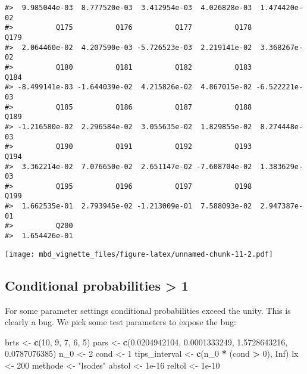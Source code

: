 \documentclass[]{article}
\newenvironment{Shaded}{\begin{snugshade}}{\end{snugshade}}
\newcommand{\DecValTok}[1]{\textcolor[rgb]{0.00,0.00,0.81}{#1}}
\newcommand{\FloatTok}[1]{\textcolor[rgb]{0.00,0.00,0.81}{#1}}
\newcommand{\KeywordTok}[1]{\textcolor[rgb]{0.13,0.29,0.53}{\textbf{#1}}}
\newcommand{\NormalTok}[1]{#1}
\newcommand{\OperatorTok}[1]{\textcolor[rgb]{0.81,0.36,0.00}{\textbf{#1}}}
\newcommand{\OtherTok}[1]{\textcolor[rgb]{0.56,0.35,0.01}{#1}}
\newcommand{\StringTok}[1]{\textcolor[rgb]{0.31,0.60,0.02}{#1}}
\begin{document}
\begin{verbatim}
#>  9.985044e-03  8.777520e-03  3.412954e-03  4.026828e-03  1.474420e-02 
#>          Q175          Q176          Q177          Q178          Q179 
#>  2.064460e-02  4.207590e-03 -5.726523e-03  2.219141e-02  3.368267e-02 
#>          Q180          Q181          Q182          Q183          Q184 
#> -8.499141e-03 -1.644039e-02  4.215826e-02  4.867015e-02 -6.522221e-03 
#>          Q185          Q186          Q187          Q188          Q189 
#> -1.216580e-02  2.296584e-02  3.055635e-02  1.829855e-02  8.274448e-03 
#>          Q190          Q191          Q192          Q193          Q194 
#>  3.362214e-02  7.076650e-02  2.651147e-02 -7.608704e-02  1.383629e-03 
#>          Q195          Q196          Q197          Q198          Q199 
#>  1.662535e-01  2.793945e-02 -1.213009e-01  7.588093e-02  2.947387e-01 
#>          Q200 
#>  1.654426e-01
\end{verbatim}

\texttt{[image: mbd\_vignette\_files/figure-latex/unnamed-chunk-11-2.pdf]}

\hypertarget{conditional-probabilities-1}{%
\subsection{Conditional probabilities \textgreater{} 1}\label{conditional-probabilities-1}}

For some parameter settings conditional probabilities exceed the unity. This is
clearly a bug.
We pick some test parameters to expose the bug:

\begin{Shaded}
\begin{Highlighting}[]
\NormalTok{brts <-}\StringTok{ }\KeywordTok{c}\NormalTok{(}\DecValTok{10}\NormalTok{, }\DecValTok{9}\NormalTok{, }\DecValTok{7}\NormalTok{, }\DecValTok{6}\NormalTok{, }\DecValTok{5}\NormalTok{)}
\NormalTok{pars <-}\StringTok{ }\KeywordTok{c}\NormalTok{(}\FloatTok{0.0204942104}\NormalTok{, }\FloatTok{0.0001333249}\NormalTok{, }\FloatTok{1.5728643216}\NormalTok{, }\FloatTok{0.0787076385}\NormalTok{)}
\NormalTok{n_}\DecValTok{0}\NormalTok{ <-}\StringTok{ }\DecValTok{2}
\NormalTok{cond <-}\StringTok{ }\DecValTok{1}
\NormalTok{tips_interval <-}\StringTok{ }\KeywordTok{c}\NormalTok{(n_}\DecValTok{0} \OperatorTok{*}\StringTok{ }\NormalTok{(cond }\OperatorTok{>}\StringTok{ }\DecValTok{0}\NormalTok{), }\OtherTok{Inf}\NormalTok{)}
\NormalTok{lx <-}\StringTok{ }\DecValTok{200}
\NormalTok{methode <-}\StringTok{ "lsodes"}
\NormalTok{abstol <-}\StringTok{ }\FloatTok{1e-16}
\NormalTok{reltol <-}\StringTok{ }\FloatTok{1e-10}
\end{Highlighting}
\end{Shaded}
\end{document}
